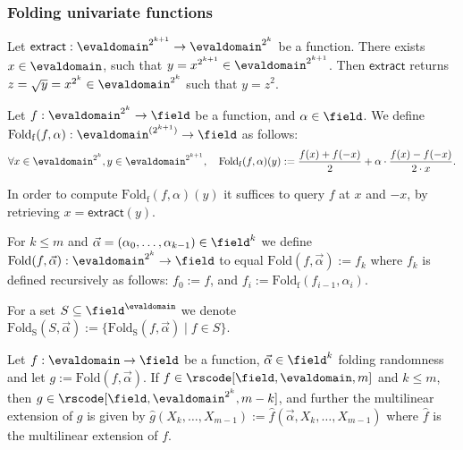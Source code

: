 \subsubsection{Folding univariate functions}

\begin{definition}\label{def:extract}
    Let $\mathsf{extract}:\evaldomain^{2^{k+1}}\rightarrow \evaldomain^{2^k}$ be a function. There exists $x \in \evaldomain$, such that $y = x^{2^{k+1}}\in\evaldomain^{2^{k+1}}$. Then $\mathsf{extract}$ returns $z = \sqrt{y} = x^{2^k}\in\evaldomain^{2^k}$ such that $y = z^2$.
\end{definition}

\begin{definition}\label{def:foldf}
    Let $f : \evaldomain^{2^k} \to \field$ be a function, and $\alpha \in \field$. We define $\mathrm{Fold_f}(f, {\alpha}) : \evaldomain^{(2^{k+1})} \to \field$ as follows:
    \[
    \forall x \in \evaldomain^{2^k}, y \in \evaldomain^{2^{k+1}}, \quad \mathrm{Fold_f}(f, \alpha)(y) := \frac{f(x) + f(-x)}{2} + \alpha \cdot \frac{f(x) - f(-x)}{2 \cdot x}.
    \]

    In order to compute $\mathrm{Fold_f}(f, \alpha)(y)$ it suffices to query $f$ at $x$ and $-x$, by retrieving $x=\mathsf{extract}(y)$.
\end{definition}

\begin{definition}\label{def:fold_k}
    For $k \leq m$ and $\vec{\alpha} = (\alpha_0, \ldots, \alpha_{k-1}) \in \field^k$ we define $\mathrm{Fold}(f, \vec{\alpha}) : \evaldomain^{2^k} \to \field$ to equal $\mathrm{Fold}(f, \vec{\alpha}) := f_k$ where $f_k$ is defined recursively as follows: $f_0 := f$, and $f_i := \mathrm{Fold_f}(f_{i-1}, \alpha_i)$. 
\end{definition}

\begin{definition}\label{def:fold_k_set}
    For a set $S \subseteq \field^{\evaldomain}$ we denote $\mathrm{Fold_{S}}(S, \vec{\alpha}) := \{\mathrm{Fold_{S}}(f, \vec{\alpha}) \mid f \in S\}$.
\end{definition}

\begin{lemma}\label{lemma:fold_fg}
    Let $f : \evaldomain \to \field$ be a function, $\vec{\alpha} \in \field^k$ folding randomness and let $g := \mathrm{Fold}(f, \vec{\alpha})$. If $f \in \rscode[\field, \evaldomain, m]$ and $k \leq m$, then $g \in \rscode[\field, \evaldomain^{2^k}, m - k]$, and further the multilinear extension of $g$ is given by $\hat{g}(X_k, \ldots, X_{m-1}) := \hat{f}(\vec{\alpha}, X_k, \ldots, X_{m-1})$ where $\hat{f}$ is the multilinear extension of $f$.
\end{lemma}

